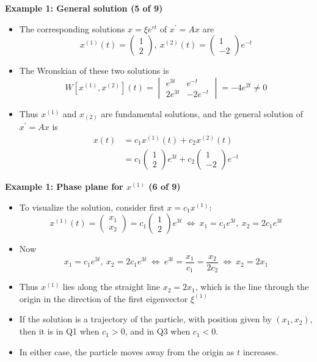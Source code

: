 \documentclass[11pt,a4paper]{article}
\begin{document}
	\textbf{Example 1: General solution (5 of 9) }
	\begin{itemize}
		\item The corresponding solutions $x = \xi e^{rt}$ of $x^\prime = Ax$ are
		$$
		x^{(1)}(t) =
		\begin{pmatrix}
			1\\
			2
		\end{pmatrix},\ 
		x^{(2)}(t) =
		\begin{pmatrix}
			1\\
			-2
		\end{pmatrix}e^{-t}
		$$
		\item The Wronskian of these two solutions is
		$$
		W[x^{(1)},x^{(2)}](t) =
		\begin{vmatrix}
			e^{3t} & e^{-t}\\
			2e^{3t} & -2e^{-t}
		\end{vmatrix}
		= -4e^{2t} \neq 0
		$$
		\item Thus $x^{(1)}$ and $x_{(2)}$ are fundamental solutions, and the general solution of $x^\prime = Ax$ is
		\begin{align*}
			x(t) 
			&= c_1x^{(1)}(t) + c_2x^{(2)}(t)\\
			&= c_1
			\begin{pmatrix}
				1\\
				2
			\end{pmatrix}e^{3t} + c_2
			\begin{pmatrix}
				1\\
				-2
			\end{pmatrix}e^{-t}
		\end{align*}
	\end{itemize}
	\textbf{Example 1: Phase plane for $x^{(1)}$ (6 of 9) }
	\begin{itemize}
		\item To visualize the solution, consider first $x=c_1x^{(1)}$:
		$$
		x^{(1)}(t)=
		\begin{pmatrix}
			x_1\\
			x_2
		\end{pmatrix} = c_1
		\begin{pmatrix}
			1\\
			2
		\end{pmatrix}e^{3t}\ \Leftrightarrow\ 
		x_1 = c_1e^{3t},\ x_2 = 2c_1e^{3t}
		$$
		\item Now
		$$
		x_1 = c_1e^{3t},\ x_2 = 2c_1e^{3t}\ \Leftrightarrow\ 
		e^{3t} = \frac{x_1}{c_1} = \frac{x_2}{2c_2}\ \Leftrightarrow\ x_2 = 2x_1
		$$
		\item Thus $x^{(1)}$ lies along the straight line $x_2 = 2x_1$, which is the line through the origin in the direction of the first eigenvector $\xi^{(1)}$
		\item If the solution is a trajectory of the particle, with position given by $(x_1, x_2)$, then it is in Q1 when $c_1 > 0$, and in Q3 when $c_1 < 0$.
		\item In either case, the particle moves away from the origin as $t$ increases. 
	\end{itemize}
\end{document}
